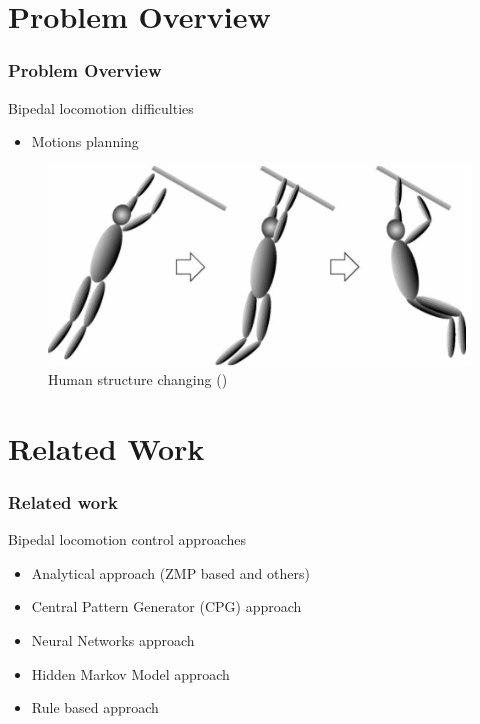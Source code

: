 \documentclass{beamer}
\begin{document}
	\section*{Problem Overview}
	\begin{frame}
		\frametitle{Problem Overview}
		\begin{block}{Bipedal locomotion difficulties}
			\begin{itemize}
				\item 
					Motions planning
			\end{itemize}
		\end{block}

		\begin{figure}[h!]
			\begin{minipage}[H]{\linewidth}
				\centering
				\includegraphics[scale=0.5]{presentation_images/32}
				\caption{Human structure changing (\cite{nakamura2000dynamics})}
			\end{minipage}
		\end{figure}
	\end{frame}
		

	\section*{Related Work}
	\begin{frame}
		\frametitle{Related work}
		\begin{block}{Bipedal locomotion control approaches}
			\begin{itemize}
				\item
					Analytical approach (ZMP based and others)
				\item
					Central Pattern Generator (CPG) approach
				\item
					Neural Networks approach
				\item 
					Hidden Markov Model approach
				\item
					Rule based approach
			\end{itemize}
		\end{block}
	\end{frame}
\end{document}
